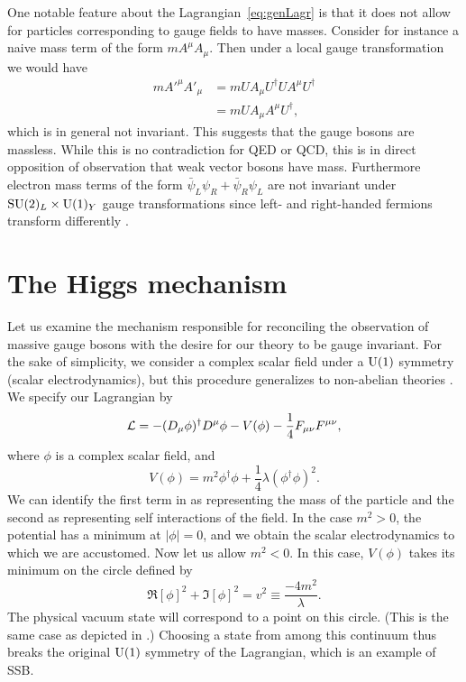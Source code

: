 One notable feature about the Lagrangian~\eqref{eq:genLagr} is that
it does not allow for particles corresponding to gauge fields to have masses.
Consider for instance a naive mass term of the form $mA^{\mu}A_{\mu}$. Then 
under a local gauge transformation we would have
\begin{equation}
  \begin{aligned}
  mA'^{\mu}A'_{\mu}&=mUA_{\mu}U^{\dagger}UA^{\mu}U^{\dagger} \\
                   &=mUA_{\mu}A^{\mu}U^{\dagger},
  \end{aligned}
\end{equation}
which is in general not invariant. This suggests that the gauge bosons are
massless. While this is no contradiction for QED or QCD, this is in direct
opposition of observation that weak vector bosons have mass. Furthermore
electron mass terms of the form $\bar{\psi}_{L}\psi_{R}+
\bar{\psi}_{R}\psi_{L}$ are not invariant under 
$\operatorname{SU}(2)_{L}\times \operatorname{U}(1)_{Y}$ gauge transformations since left- and 
right-handed fermions
transform differently \cite{dittmaier_higgs_2013}.

\section{The Higgs mechanism}

Let us examine the mechanism responsible for reconciling the observation of 
massive gauge bosons with the desire for our theory to be gauge invariant. For 
the sake of simplicity, we consider a complex scalar field under a $\operatorname{U}(1)$ 
symmetry (scalar electrodynamics), but this procedure generalizes to 
non-abelian theories \cite{srednicki_quantum_2007}. 
We specify our Lagrangian by 
\begin{equation}
  \label{eq:HLagr1}
  \mathcal{L}=-(D_{\mu}\phi)^{\dagger}D^{\mu}\phi-V(\phi)
              -\frac{1}{4}F_{\mu\nu}F^{\mu\nu},
\end{equation}
where $\phi$ is a complex scalar field, and
\begin{equation}
  \label{eq:pot}
  V(\phi)=m^{2}\phi^{\dagger}\phi+\frac{1}{4}\lambda(\phi^{\dagger}\phi)^{2}.
\end{equation}
We can identify the first term in  as representing the mass of
the particle and the second as representing self interactions of the field.
In the case $m^2>0$, the potential has a minimum at $|\phi|=0$, and we obtain 
the scalar electrodynamics to which we are accustomed. Now let us allow 
$m^2<0$. In this case, $V(\phi)$ takes its minimum on the circle defined by
\begin{equation}
  \label{eq:v2}
  \Re[\phi]^2+\Im[\phi]^2=v^2\equiv\frac{-4m^2}{\lambda}.
\end{equation}
The physical vacuum state will correspond to a point on this circle. (This
is the same case as depicted in .) Choosing a state 
from among this continuum thus breaks the original
$\operatorname{U}(1)$ symmetry of the Lagrangian, which is an example of SSB. 

